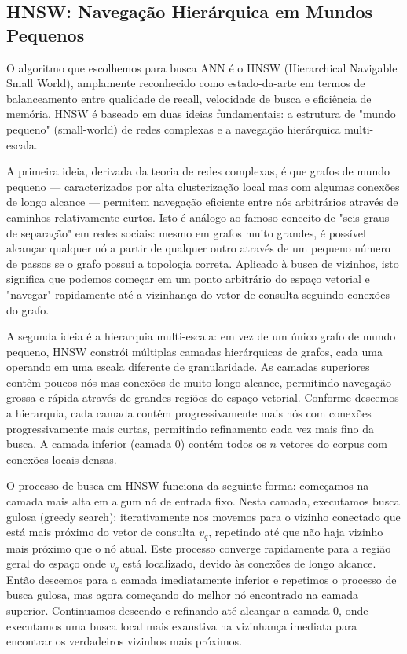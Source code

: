 \documentclass[12pt,a4paper]{article}
\begin{document}
\subsection{HNSW: Navegação Hierárquica em Mundos Pequenos}

O algoritmo que escolhemos para busca ANN é o HNSW (Hierarchical Navigable Small World), amplamente reconhecido como estado-da-arte em termos de balanceamento entre qualidade de recall, velocidade de busca e eficiência de memória. HNSW é baseado em duas ideias fundamentais: a estrutura de "mundo pequeno" (small-world) de redes complexas e a navegação hierárquica multi-escala.

A primeira ideia, derivada da teoria de redes complexas, é que grafos de mundo pequeno — caracterizados por alta clusterização local mas com algumas conexões de longo alcance — permitem navegação eficiente entre nós arbitrários através de caminhos relativamente curtos. Isto é análogo ao famoso conceito de "seis graus de separação" em redes sociais: mesmo em grafos muito grandes, é possível alcançar qualquer nó a partir de qualquer outro através de um pequeno número de passos se o grafo possui a topologia correta. Aplicado à busca de vizinhos, isto significa que podemos começar em um ponto arbitrário do espaço vetorial e "navegar" rapidamente até a vizinhança do vetor de consulta seguindo conexões do grafo.

A segunda ideia é a hierarquia multi-escala: em vez de um único grafo de mundo pequeno, HNSW constrói múltiplas camadas hierárquicas de grafos, cada uma operando em uma escala diferente de granularidade. As camadas superiores contêm poucos nós mas conexões de muito longo alcance, permitindo navegação grossa e rápida através de grandes regiões do espaço vetorial. Conforme descemos a hierarquia, cada camada contém progressivamente mais nós com conexões progressivamente mais curtas, permitindo refinamento cada vez mais fino da busca. A camada inferior (camada 0) contém todos os $n$ vetores do corpus com conexões locais densas.

O processo de busca em HNSW funciona da seguinte forma: começamos na camada mais alta em algum nó de entrada fixo. Nesta camada, executamos busca gulosa (greedy search): iterativamente nos movemos para o vizinho conectado que está mais próximo do vetor de consulta $v_q$, repetindo até que não haja vizinho mais próximo que o nó atual. Este processo converge rapidamente para a região geral do espaço onde $v_q$ está localizado, devido às conexões de longo alcance. Então descemos para a camada imediatamente inferior e repetimos o processo de busca gulosa, mas agora começando do melhor nó encontrado na camada superior. Continuamos descendo e refinando até alcançar a camada 0, onde executamos uma busca local mais exaustiva na vizinhança imediata para encontrar os verdadeiros vizinhos mais próximos.
\end{document}

